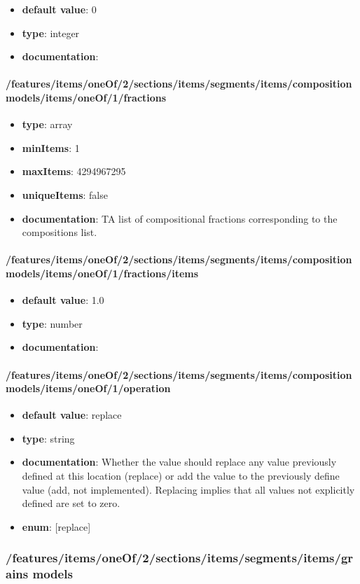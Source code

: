 \begin{itemize}\item {\bf default value}: 0
\item {\bf type}: integer
\item {\bf documentation}: 
\end{itemize}\paragraph{/features/items/oneOf/2/sections/items/segments/items/composition models/items/oneOf/1/fractions}
\begin{itemize}\item {\bf type}: array
\item {\bf minItems}: 1
\item {\bf maxItems}: 4294967295
\item {\bf uniqueItems}: false
\item {\bf documentation}: TA list of compositional fractions corresponding to the compositions list.
\end{itemize}\paragraph{/features/items/oneOf/2/sections/items/segments/items/composition models/items/oneOf/1/fractions/items}
\begin{itemize}\item {\bf default value}: 1.0
\item {\bf type}: number
\item {\bf documentation}: 
\end{itemize}\paragraph{/features/items/oneOf/2/sections/items/segments/items/composition models/items/oneOf/1/operation}
\begin{itemize}\item {\bf default value}: replace
\item {\bf type}: string
\item {\bf documentation}: Whether the value should replace any value previously defined at this location (replace) or add the value to the previously define value (add, not implemented). Replacing implies that all values not explicitly defined are set to zero.
\item {\bf enum}: [replace]\end{itemize}\subsubsection{/features/items/oneOf/2/sections/items/segments/items/grains models}
